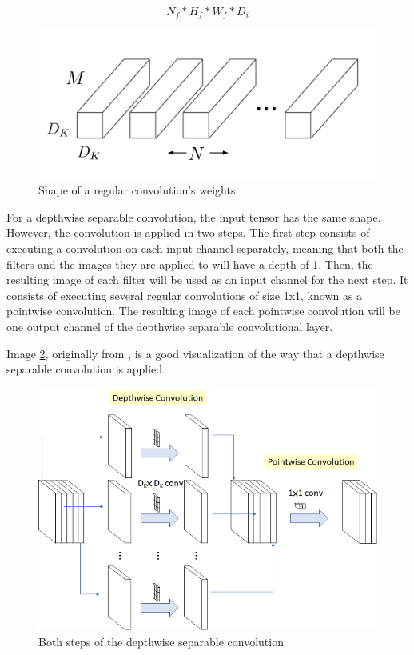 \documentclass[runningheads]{llncs}
\begin{document}
\begin{equation}
    \label{regular_size}
    N_{f} * H_{f} * W_{f} * D_{i}
\end{equation}

\begin{figure}
    \begin{center}
        \includegraphics[scale=0.1]{conv_weights_1.png}
        \caption{Shape of a regular convolution's weights}
        \label{conv_weights_1}
    \end{center}
\end{figure}

For a depthwise separable convolution, the input tensor has the same shape. However, the convolution is applied in two steps. The first step consists of executing a convolution on each input channel separately, meaning that both the filters and the images they are applied to will have a depth of 1. Then, the resulting image of each filter will be used as an input channel for the next step. It consists of executing several regular convolutions of size 1x1, known as a pointwise convolution. The resulting image of each pointwise convolution will be one output channel of the depthwise separable convolutional layer.

Image \ref{depthwise_image}, originally from \cite{depthwise_image_towards}, is a good visualization of the way that a depthwise separable convolution is applied.

\begin{figure}
    \begin{center}
        \includegraphics[scale=0.35]{depthwise_sep.png}
        \caption{Both steps of the depthwise separable convolution}
        \label{depthwise_image}
    \end{center}
\end{figure}
\end{document}
